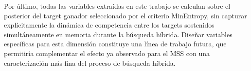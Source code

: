 Por último, todas las variables extraídas en este trabajo se calculan sobre el posterior del target ganador seleccionado por el criterio MinEntropy, sin capturar explícitamente la dinámica de competencia entre los targets sostenidos simultáneamente en memoria durante la búsqueda híbrida. Diseñar variables específicas para esta dimensión constituye una línea de trabajo futura, que permitiría complementar el efecto ya observado para el MSS con una caracterización más fina del proceso de búsqueda híbrida.
